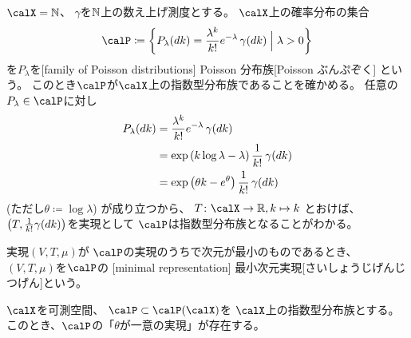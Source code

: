 \documentclass[report]{jlreq}
\begin{document}
\begin{example}
    $\calX = \N$、
    $\gamma$を$\mathbb{N}$上の数え上げ測度とする。
    $\calX$上の確率分布の集合
    \begin{equation}
        \calP \coloneqq \mybrace{
            P_\lambda(dk)
                = \frac{\lambda^k}{k!} e^{-\lambda} \, \gamma(dk)
            \;\Big|\;
            \lambda > 0
        }
    \end{equation}
    を$P_\lambda$を[family of Poisson distributions]
        {Poisson 分布族}[Poisson ぶんぷぞく]
    という。
    このとき$\calP$が$\calX$上の指数型分布族であることを確かめる。
    任意の$P_\lambda \in \calP$に対し
    \begin{alignat}{1}
        P_\lambda(dk)
            &= \frac{\lambda^k}{k!} e^{-\lambda} \, \gamma(dk) \\
            &= \exp\left({
                k \log\lambda - \lambda
            }\right) \frac{1}{k!} \, \gamma(dk) \\
            &= \exp\left({
                \theta k - e^\theta
            }\right) \frac{1}{k!} \, \gamma(dk)
    \end{alignat}
    (ただし$\theta \coloneqq \log \lambda$)
    が成り立つから、
    $T \colon \calX \to \R, k \mapsto k$
    とおけば、
    $\left({ T, \frac{1}{k!} \gamma(dk) }\right)$を実現として
    $\calP$は指数型分布族となることがわかる。
\end{example}

\begin{definition}[最小次元実現]
    実現$(V, T, \mu)$が
    $\calP$の実現のうちで次元が最小のものであるとき、
    $(V, T, \mu)$を$\calP$の
    [minimal representation]
        {最小次元実現}[さいしょうじげんじつげん]という。
\end{definition}

\begin{theorem}
    $\calX$を可測空間、
    $\calP \subset \calP(\calX)$を
    $\calX$上の指数型分布族とする。
    このとき、$\calP$の「$\theta$が一意の実現」が存在する。
\end{theorem}
\end{document}
